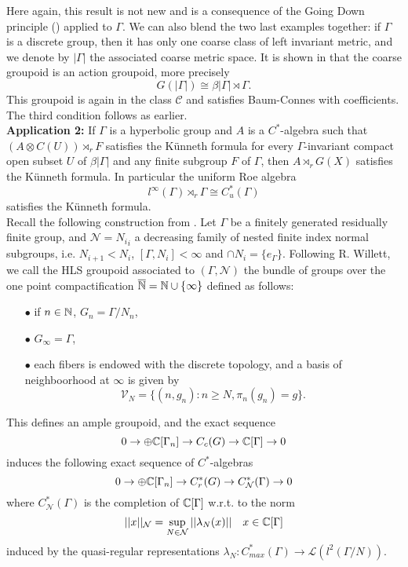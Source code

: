 Here again, this result is not new and is a consequence of the Going Down principle (\cite{ChabertEOY}) applied to $\Gamma$. We can also blend the two last examples together: if $\Gamma$ is a discrete group, then it has only one coarse class of left invariant metric, and we denote by $|\Gamma|$ the associated coarse metric space. It is shown in \cite{SkTuYu} that the coarse groupoid is an action groupoid, more precisely \[G(|\Gamma|) \cong \beta |\Gamma| \rtimes \Gamma.\]
This groupoid is again in the class $\mathcal C$ and satisfies Baum-Connes with coefficients. The third condition follows as earlier.\\

\textbf{Application 2:} If $\Gamma$ is a hyperbolic group and $A$ is a $C^*$-algebra such that $(A\otimes C(U))\rtimes_r F$ satisfies the Künneth formula for every $\Gamma$-invariant compact open subset $U$ of $\beta |\Gamma|$ and any finite subgroup $F$ of $\Gamma$, then $A\rtimes_r G(X)$ satisfies the Künneth formula. In particular the uniform Roe algebra \[l^\infty(\Gamma)\rtimes_r \Gamma\cong C_u^* (\Gamma)\] satisfies the Künneth formula.  \\

Recall the following construction from \cite{HLS}. Let $\Gamma$ be a finitely generated residually finite group, and $\mathcal N = {N_i}_i$ a decreasing family of nested finite index normal subgroups, i.e. $N_{i+1} < N_i $, $[\Gamma, N_i]<\infty$ and $\cap N_i =\{e_\Gamma\}$. Following R. Willett, we call the HLS groupoid associated to $(\Gamma,\mathcal N)$ the bundle of groups over the one point compactification $\overline{\mathbb N}=\mathbb N\cup \{\infty\}$ defined as follows:
\begin{itemize}
\item[$\bullet$] if $n\in\mathbb N$, $G_n= \Gamma / N_n $,
\item[$\bullet$] $G_\infty=\Gamma$,
\item[$\bullet$] each fibers is endowed with the discrete topology, and a basis of neighboorhood at $\infty$ is given by   
\[ \mathcal V_{N} = \{(n,g_n) : n\geq N, \pi_n(g_n) = g\}.\]
\end{itemize}
This defines an ample groupoid, and the exact sequence
\[ 0 \rightarrow \oplus \mathbb C[\Gamma_n] \rightarrow C_c(G) \rightarrow \mathbb C [\Gamma]  \rightarrow 0\]      
induces the following exact sequence of $C^*$-algebras
\[ 0 \rightarrow \oplus \mathbb C[\Gamma_n] \rightarrow C_r^*(G) \rightarrow C^*_{\mathcal N} (\Gamma)  \rightarrow 0\]   
where $C^*_{\mathcal N}(\Gamma)$ is the completion of $\mathbb C[\Gamma]$ w.r.t. to the norm
\[||x||_{\mathcal N} = \sup_{N\in \mathcal N} ||\lambda_{N} (x)||\quad x\in \mathbb C[\Gamma] \]
induced by the quasi-regular representations $\lambda_{N} : C_{max}^*(\Gamma) \rightarrow \mathcal L(l^2(\Gamma/ N))$.  \\ 


